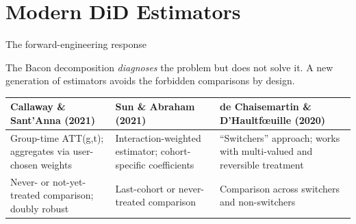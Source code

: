 \documentclass[aspectratio=169, 10pt]{beamer}
\begin{document}
\section{Modern DiD Estimators}

\begin{frame}{The forward-engineering response}

  The Bacon decomposition \emph{diagnoses} the problem but does not solve it.
  A new generation of estimators avoids the forbidden comparisons by design.

  \medskip
  \begin{center}
  \small
  \renewcommand{\arraystretch}{1.3}
  \begin{tabular}{p{3.5cm} p{3.5cm} p{3.5cm}}
    \toprule
    \textbf{Callaway \& Sant'Anna (2021)} & \textbf{Sun \& Abraham (2021)} & \textbf{de Chaisemartin \& D'Haultf\oe{}uille (2020)} \\
    \midrule
    Group-time ATT(g,t); aggregates via user-chosen weights &
    Interaction-weighted estimator; cohort-specific coefficients &
    ``Switchers'' approach; works with multi-valued and reversible treatment \\
    \midrule
    Never- or not-yet-treated comparison; doubly robust &
    Last-cohort or never-treated comparison &
    Comparison across switchers and non-switchers \\
    \bottomrule
  \end{tabular}
  \end{center}

\end{frame}
\end{document}
